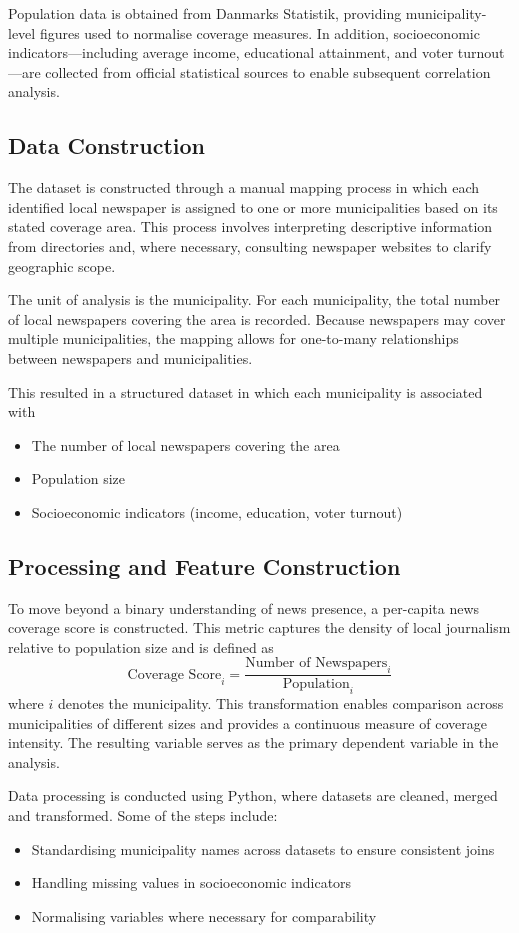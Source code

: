 \documentclass[12pt, a4paper]{article}
\begin{document}
Population data is obtained from Danmarks Statistik, providing municipality-level figures used to normalise coverage measures. In addition, socioeconomic indicators---including average income, educational attainment, and voter turnout---are collected from official statistical sources to enable subsequent correlation analysis.

\subsection{Data Construction}
The dataset is constructed through a manual mapping process in which each identified local newspaper is assigned to one or more municipalities based on its stated coverage area. This process involves interpreting descriptive information from directories and, where necessary, consulting newspaper websites to clarify geographic scope.

The unit of analysis is the municipality. For each municipality, the total number of local newspapers covering the area is recorded. Because newspapers may cover multiple municipalities, the mapping allows for one-to-many relationships between newspapers and municipalities.

This resulted in a structured dataset in which each municipality is associated with
\begin{itemize}
    \item The number of local newspapers covering the area
    \item Population size
    \item Socioeconomic indicators (income, education, voter turnout)
\end{itemize}

\subsection{Processing and Feature Construction}
To move beyond a binary understanding of news presence, a per-capita news coverage score is constructed. This metric captures the density of local journalism relative to population size and is defined as
\[
\text{Coverage Score}_i = \frac{\text{Number of Newspapers}_i}{\text{Population}_i}
\]
where $i$ denotes the municipality.
This transformation enables comparison across municipalities of different sizes and provides a continuous measure of coverage intensity. The resulting variable serves as the primary dependent variable in the analysis.

Data processing is conducted using Python, where datasets are cleaned, merged and transformed. Some of the steps include:
\begin{itemize}
    \item Standardising municipality names across datasets to ensure consistent joins
    \item Handling missing values in socioeconomic indicators
    \item Normalising variables where necessary for comparability
\end{itemize}
\end{document}
